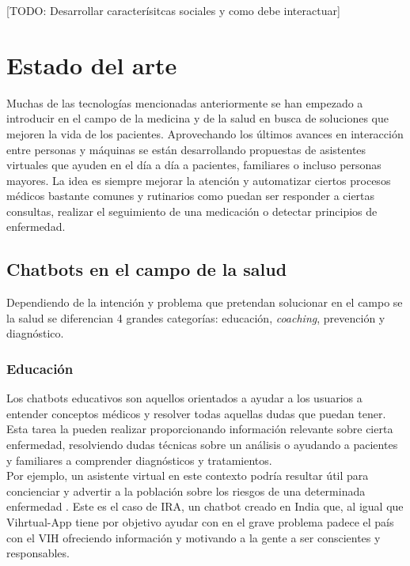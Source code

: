 [TODO: Desarrollar caracterísitcas sociales y como debe interactuar]


\section{Estado del arte}
Muchas de las tecnologías mencionadas anteriormente se han empezado a introducir en el campo de la medicina y de la salud en busca de soluciones que mejoren la vida de los pacientes. Aprovechando los últimos avances en interacción entre personas y máquinas  se están desarrollando propuestas de asistentes virtuales que ayuden en el día a día a pacientes, familiares o incluso personas mayores. La idea es siempre mejorar la atención y automatizar ciertos procesos médicos \cite{healthAgents} bastante comunes y rutinarios como puedan ser responder a ciertas consultas, realizar el seguimiento de una medicación o detectar principios de enfermedad. \\

\subsection{Chatbots en el campo de la salud}
Dependiendo de la intención y problema que pretendan solucionar en el campo se la salud se diferencian 4 grandes categorías: educación, \textit{coaching}, prevención y diagnóstico.\\

\subsubsection{Educación}
Los chatbots educativos son aquellos orientados a ayudar a los usuarios a entender conceptos médicos y resolver todas aquellas dudas que puedan tener. Esta tarea la pueden realizar proporcionando información relevante sobre cierta enfermedad, resolviendo dudas técnicas sobre un análisis o ayudando a pacientes y familiares a comprender diagnósticos y tratamientos. \\

Por ejemplo, un asistente virtual en este contexto podría resultar útil para  concienciar y advertir a la población sobre los riesgos de una determinada enfermedad . Este es el caso de IRA, un chatbot creado en India que, al igual que Vihrtual-App tiene por objetivo ayudar con en el grave problema padece el país con el VIH ofreciendo información y motivando a la gente a ser conscientes y responsables.\\

